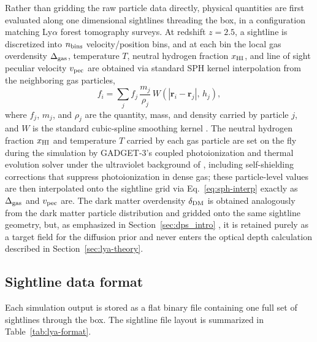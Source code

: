 Rather than gridding the raw particle data directly, physical quantities are first evaluated along one dimensional sightlines threading the box, in a configuration matching Ly$\alpha$ forest tomography surveys. At redshift $z=2.5$, a sightline is discretized into $n_{\rm bins}$ velocity/position bins, and at each bin the local gas overdensity $\Delta_{\rm gas}$, temperature $T$, neutral hydrogen fraction $x_{\rm HI}$, and line of sight peculiar velocity $v_{\rm pec}$ are obtained via standard SPH kernel interpolation from the neighboring gas particles,
\begin{equation}
f_i = \sum_j f_j\,\frac{m_j}{\rho_j}\,W\!\left(|\mathbf{r}_i-\mathbf{r}_j|,\,h_j\right),
\label{eq:sph-interp}
\end{equation}
where $f_j$, $m_j$, and $\rho_j$ are the quantity, mass, and density carried by particle $j$, and $W$ is the standard cubic-spline smoothing kernel \citep{sph1992,Maitra_2026}. The neutral hydrogen fraction $x_{\rm HI}$ and temperature $T$ carried by each gas particle are set on the fly during the simulation by GADGET-3's coupled photoionization and thermal evolution solver under the ultraviolet background of \citet{puchwein_sherwood-relics_2023}, including self-shielding corrections that suppress photoionization in dense gas; these particle-level values are then interpolated onto the sightline grid via Eq.~\ref{eq:sph-interp} exactly as $\Delta_{\rm gas}$ and $v_{\rm pec}$ are. The dark matter overdensity $\delta_{\rm DM}$ is obtained analogously from the dark matter particle distribution and gridded onto the same sightline geometry, but, as emphasized in Section~\ref{sec:dps_intro} , it is retained purely as a target field for the diffusion prior and never enters the optical depth calculation described in Section~\ref{sec:lya-theory}.

\subsection{Sightline data format}
\label{sec:lya-format}

Each simulation output is stored as a flat binary file containing one full set of sightlines through the box. The sightline file layout is summarized in Table~\ref{tab:lya-format}.

